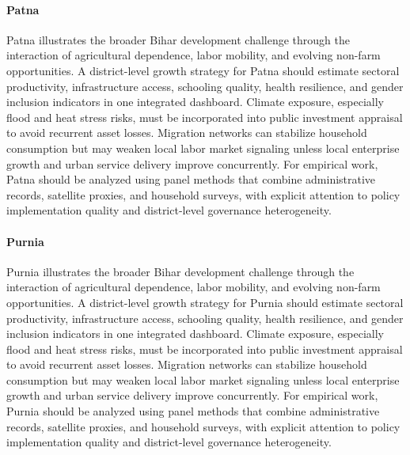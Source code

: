 \documentclass[preprint,12pt]{elsarticle}
\begin{document}
\paragraph{Patna} Patna illustrates the broader Bihar development challenge through the interaction of agricultural dependence, labor mobility, and evolving non-farm opportunities. A district-level growth strategy for Patna should estimate sectoral productivity, infrastructure access, schooling quality, health resilience, and gender inclusion indicators in one integrated dashboard. Climate exposure, especially flood and heat stress risks, must be incorporated into public investment appraisal to avoid recurrent asset losses. Migration networks can stabilize household consumption but may weaken local labor market signaling unless local enterprise growth and urban service delivery improve concurrently. For empirical work, Patna should be analyzed using panel methods that combine administrative records, satellite proxies, and household surveys, with explicit attention to policy implementation quality and district-level governance heterogeneity.

\paragraph{Purnia} Purnia illustrates the broader Bihar development challenge through the interaction of agricultural dependence, labor mobility, and evolving non-farm opportunities. A district-level growth strategy for Purnia should estimate sectoral productivity, infrastructure access, schooling quality, health resilience, and gender inclusion indicators in one integrated dashboard. Climate exposure, especially flood and heat stress risks, must be incorporated into public investment appraisal to avoid recurrent asset losses. Migration networks can stabilize household consumption but may weaken local labor market signaling unless local enterprise growth and urban service delivery improve concurrently. For empirical work, Purnia should be analyzed using panel methods that combine administrative records, satellite proxies, and household surveys, with explicit attention to policy implementation quality and district-level governance heterogeneity.
\end{document}
